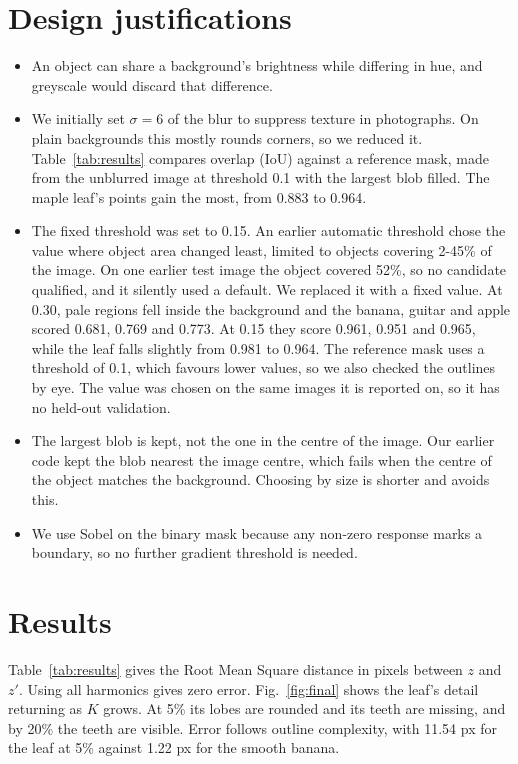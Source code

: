 \documentclass[conference]{IEEEtran}
\begin{document}
    \section{Design justifications}\label{sec:design-justifications}
    \begin{itemize}
        \item An object can share a background's brightness while differing in hue, and greyscale would discard that difference.
        \item We initially set $\sigma=6$ of the blur to suppress texture in photographs.
        On plain backgrounds this mostly rounds corners, so we reduced it.
        Table~\ref{tab:results} compares overlap (IoU) against a reference mask, made from the unblurred image at threshold 0.1 with the largest blob filled.
        The maple leaf's points gain the most, from 0.883 to 0.964.
        \item The fixed threshold was set to 0.15.
        An earlier automatic threshold chose the value where object area changed least, limited to objects covering 2-45\% of the image.
        On one earlier test image the object covered 52\%, so no candidate qualified, and it silently used a default.
        We replaced it with a fixed value.
        At 0.30, pale regions fell inside the background and the banana, guitar and apple scored 0.681, 0.769 and 0.773.
        At 0.15 they score 0.961, 0.951 and 0.965, while the leaf falls slightly from 0.981 to 0.964.
        The reference mask uses a threshold of 0.1, which favours lower values, so we also checked the outlines by eye.
        The value was chosen on the same images it is reported on, so it has no held-out validation.
        \item The largest blob is kept, not the one in the centre of the image.
        Our earlier code kept the blob nearest the image centre, which fails when the centre of the object matches the background.
        Choosing by size is shorter and avoids this.
        \item We use Sobel on the binary mask because any non-zero response marks a boundary, so no further gradient threshold is needed.
    \end{itemize}

    \section{Results}\label{sec:results}

    Table~\ref{tab:results} gives the Root Mean Square distance in pixels between $z$ and $z'$.
    Using all harmonics gives zero error.
    Fig.~\ref{fig:final} shows the leaf's detail returning as $K$ grows.
    At 5\% its lobes are rounded and its teeth are missing, and by 20\% the teeth are visible.
    Error follows outline complexity, with 11.54 px for the leaf at 5\% against 1.22 px for the smooth banana.
\end{document}
